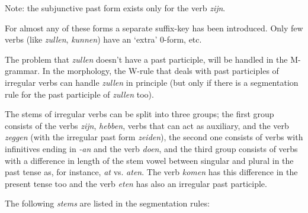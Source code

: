Note: the subjunctive past form exists only for the verb {\em zijn}.

For almost any of these forms a separate suffix-key has been introduced. 
Only few verbs (like {\em zullen}, {\em kunnen}) have an `extra' 0-form, etc.

The problem that {\em zullen} doesn't have a past participle, will be
handled in the M-grammar. In the morphology, the W-rule that deals
with past participles of irregular verbs can handle {\em zullen} in principle
(but only if there is a segmentation rule for the past participle of {\em 
zullen} too).

The stems of irregular verbs can be split into
three groups; the first group consists of the verbs {\em zijn}, {\em hebben},
verbs that can act as auxiliary,
and the verb {\em zeggen} (with the irregular past form {\em zeiden}), 
the second one consists of verbs with infinitives ending in {\em -an} and 
the verb {\em doen}, and the third group consists of verbs with a difference in 
length of the stem
vowel between singular and plural in the past tense as, for instance, {\em at} 
vs. {\em aten}. The verb {\em komen} has this difference in the present tense 
too and the verb {\em eten} has also an irregular past participle. 


The following {\em stems} are listed in the segmentation rules:

